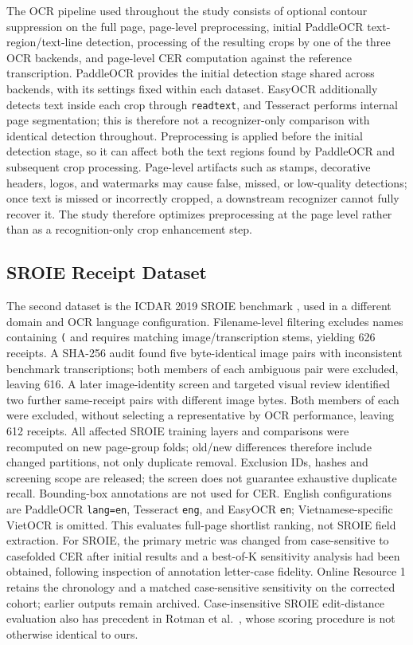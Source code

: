 \documentclass[pdflatex,sn-basic,Numbered,iicol]{sn-jnl}
\begin{document}
The OCR pipeline used throughout the study consists of optional contour suppression on the full page, page-level preprocessing, initial PaddleOCR text-region/text-line detection, processing of the resulting crops by one of the three OCR backends, and page-level CER computation against the reference transcription. PaddleOCR provides the initial detection stage shared across backends, with its settings fixed within each dataset. EasyOCR additionally detects text inside each crop through \texttt{readtext}, and Tesseract performs internal page segmentation; this is therefore not a recognizer-only comparison with identical detection throughout. Preprocessing is applied before the initial detection stage, so it can affect both the text regions found by PaddleOCR and subsequent crop processing. Page-level artifacts such as stamps, decorative headers, logos, and watermarks may cause false, missed, or low-quality detections; once text is missed or incorrectly cropped, a downstream recognizer cannot fully recover it. The study therefore optimizes preprocessing at the page level rather than as a recognition-only crop enhancement step.

\subsection{SROIE Receipt Dataset}

The second dataset is the ICDAR 2019 SROIE benchmark \cite{Huang2019SROIE}, used in a different domain and OCR language configuration. Filename-level filtering excludes names containing \texttt{(} and requires matching image/transcription stems, yielding 626 receipts. A SHA-256 audit found five byte-identical image pairs with inconsistent benchmark transcriptions; both members of each ambiguous pair were excluded, leaving 616. A later image-identity screen and targeted visual review identified two further same-receipt pairs with different image bytes. Both members of each were excluded, without selecting a representative by OCR performance, leaving 612 receipts. All affected SROIE training layers and comparisons were recomputed on new page-group folds; old/new differences therefore include changed partitions, not only duplicate removal. Exclusion IDs, hashes and screening scope are released; the screen does not guarantee exhaustive duplicate recall. Bounding-box annotations are not used for CER. English configurations are PaddleOCR \texttt{lang=en}, Tesseract \texttt{eng}, and EasyOCR \texttt{en}; Vietnamese-specific VietOCR is omitted. This evaluates full-page shortlist ranking, not SROIE field extraction. For SROIE, the primary metric was changed from case-sensitive to casefolded CER after initial results and a best-of-K sensitivity analysis had been obtained, following inspection of annotation letter-case fidelity. Online Resource 1 retains the chronology and a matched case-sensitive sensitivity on the corrected cohort; earlier outputs remain archived. Case-insensitive SROIE edit-distance evaluation also has precedent in Rotman et al.\ \cite{rotman2022masking}, whose scoring procedure is not otherwise identical to ours.
\end{document}
